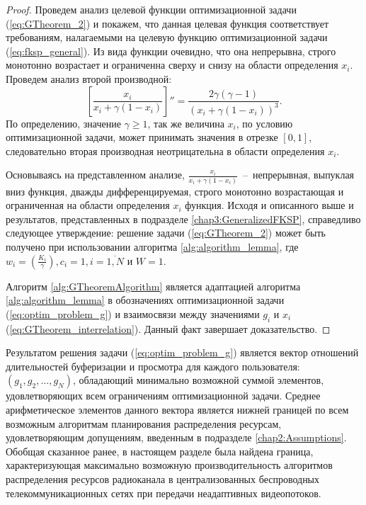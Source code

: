 \begin{proof}
Проведем анализ целевой функции оптимизационной задачи (\ref{eq:GTheorem_2}) и покажем, что данная целевая функция соответствует требованиям, налагаемыми на целевую функцию оптимизационной задачи (\ref{eq:fksp_general}). Из вида функции очевидно, что она непрерывна, строго монотонно возрастает и ограниченна сверху и снизу на области определения $x_i$. Проведем анализ второй производной:
$$\left[\frac{x_i}{x_i + \gamma (1-x_i)}\right]'' = \frac{2\gamma(\gamma - 1)}{(x_i + \gamma(1 - x_i))^3}.$$
По определению, значение $\gamma \geq 1$, так же величина $x_i$, по условию оптимизационной задачи, может принимать значения в отрезке $[0,1]$, следовательно вторая производная неотрицательна в области определения $x_i$.

Основываясь на представленном анализе, $\frac{x_i}{x_i + \gamma (1-x_i)}$~--~непрерывная, выпуклая вниз функция, дважды дифференцируемая, строго монотонно возрастающая и ограниченная на области определения $x_i$ функция. Исходя и описанного выше и результатов, представленных в подразделе \ref{chap3:GeneralizedFKSP}, справедливо следующее утверждение: решение задачи (\ref{eq:GTheorem_2}) может быть получено при использовании алгоритма \ref{alg:algorithm_lemma}, где $w_i = \left(\frac{K_i}{\gamma}\right), c_i = 1, i=\overline{1,N}$ и $W = 1$.

Алгоритм \ref{alg:GTheoremAlgorithm} является адаптацией алгоритма \ref{alg:algorithm_lemma} в обозначениях оптимизационной задачи (\ref{eq:optim_problem_g}) и взаимосвязи между значениями $g_i$ и $x_i$ (\ref{eq:GTheorem_interrelation}). Данный факт завершает доказательство.
\end{proof}

Результатом решения задачи (\ref{eq:optim_problem_g}) является вектор отношений длительностей буферизации и просмотра для каждого пользователя: $(g_1, g_2, \ldots, g_N)$, обладающий минимально возможной суммой элементов, удовлетворяющих всем ограничениям оптимизационной задачи. Среднее арифметическое элементов данного вектора является нижней границей по всем возможным алгоритмам планирования распределения ресурсам, удовлетворяющим допущениям, введенным в подразделе \ref{chap2:Assumptions}. Обобщая сказанное ранее, в настоящем разделе была найдена граница, характеризующая максимально возможную производительность алгоритмов распределения ресурсов радиоканала в централизованных беспроводных телекоммуникационных сетях при передачи неадаптивных видеопотоков.

